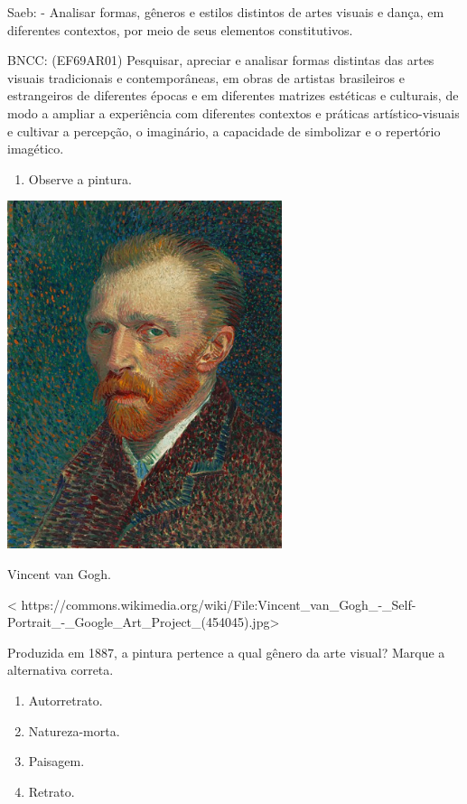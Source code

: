 \begin{escolha}
{{{{{{{{Saeb: - Analisar formas, gêneros e estilos distintos de artes visuais e
dança, em diferentes contextos, por meio de seus elementos
constitutivos.

BNCC: (EF69AR01) Pesquisar, apreciar e analisar formas distintas das
artes visuais tradicionais e contemporâneas, em obras de artistas
brasileiros e estrangeiros de diferentes épocas e em diferentes matrizes
estéticas e culturais, de modo a ampliar a experiência com diferentes
contextos e práticas artístico-visuais e cultivar a percepção, o
imaginário, a capacidade de simbolizar e o repertório imagético.

\begin{enumerate}
\def\labelenumi{\arabic{enumi}.}
\item
  Observe a pintura.
\end{enumerate}

\includegraphics[width=3.16667in,height=4.01042in]{media/image28.png}

Vincent van Gogh.

\textless{}
https://commons.wikimedia.org/wiki/File:Vincent\_van\_Gogh\_-\_Self-Portrait\_-\_Google\_Art\_Project\_(454045).jpg\textgreater{}

Produzida em 1887, a pintura pertence a qual gênero da arte visual?
Marque a alternativa correta.

\begin{enumerate}
\def\labelenumi{\alph{enumi})}
\item
  Autorretrato.
\item
  Natureza-morta.
\item
  Paisagem.
\item
  Retrato.
\end{enumerate}

}}}}}}}}
\end{escolha}
